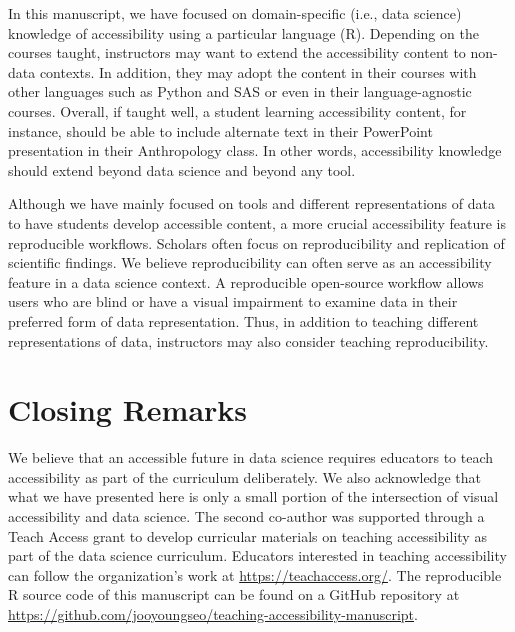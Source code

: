 \documentclass[12pt]{article}
\begin{document}
In this manuscript, we have focused on domain-specific (i.e., data science) knowledge of accessibility using a particular language (R).
Depending on the courses taught, instructors may want to extend the accessibility content to non-data contexts.
In addition, they may adopt the content in their courses with other languages such as Python and SAS or even in their language-agnostic courses.
Overall, if taught well, a student learning accessibility content, for instance, should be able to include alternate text in their PowerPoint presentation in their Anthropology class.
In other words, accessibility knowledge should extend beyond data science and beyond any tool.

Although we have mainly focused on tools and different representations of data to have students develop accessible content, a more crucial accessibility feature is reproducible workflows.
Scholars often focus on reproducibility and replication of scientific findings.
We believe reproducibility can often serve as an accessibility feature in a data science context.
A reproducible open-source workflow allows users who are blind or have a visual impairment to examine data in their preferred form of data representation.
Thus, in addition to teaching different representations of data, instructors may also consider teaching reproducibility.

\hypertarget{closing-remarks}{%
\section{Closing Remarks}\label{closing-remarks}}

We believe that an accessible future in data science requires educators to teach accessibility as part of the curriculum deliberately.
We also acknowledge that what we have presented here is only a small portion of the intersection of visual accessibility and data science.
The second co-author was supported through a Teach Access grant to develop curricular materials on teaching accessibility as part of the data science curriculum.
Educators interested in teaching accessibility can follow the organization's work at \url{https://teachaccess.org/}.
The reproducible R source code of this manuscript can be found on a GitHub repository at \url{https://github.com/jooyoungseo/teaching-accessibility-manuscript}.



\end{document}
